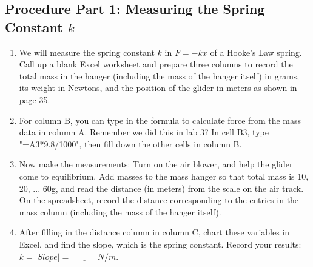 \documentclass{article}
\begin{document}
\subsection*{Procedure Part 1: Measuring the Spring Constant $k$}
\begin{enumerate}

\item We will measure the spring constant $k$ in $F=-kx$ of a Hooke's Law spring. Call up a blank Excel worksheet and prepare three columns to record the total mass in the hanger (including the mass of the hanger itself) in grams, its weight in Newtons, and the position of the glider in meters as shown in page 35. 

\item For column B, you can type in the formula to calculate force from the mass data in column A. Remember we did this in lab 3? In cell B3, type "=A3*9.8/1000", then fill down the other cells in column B. 

\item Now make the measurements: Turn on the air blower, and help the glider come to equilibrium. Add masses to the mass hanger so that total mass is 10, 20, ... 60g, and read the distance (in meters) from the scale on the air track. On the spreadsheet, record the distance corresponding to the entries in the mass column (including the mass of the hanger itself).  

\item After filling in the distance column in column C, chart these variables in Excel, and find the slope, which is the spring constant. Record your results: $k=|Slope|=\underline{~~~~~~~~~~~~~~}N/m$.

\end{enumerate}
\end{document}
